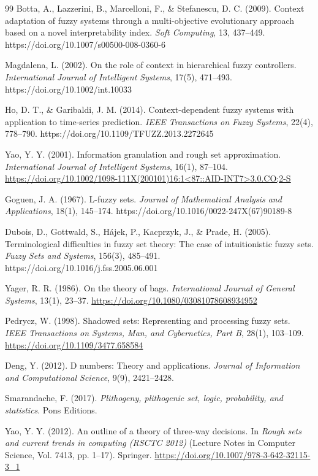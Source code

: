 \documentclass[reqno,final]{amsart}
\theoremstyle{definition}
\theoremstyle{plain}
\theoremstyle{remark}
\begin{document}
\begin{thebibliography}{99}
Botta, A., Lazzerini, B., Marcelloni, F., \& Stefanescu, D. C. (2009). Context adaptation of fuzzy systems through a multi-objective evolutionary approach based on a novel interpretability index. \textit{Soft Computing}, 13, 437--449. https://doi.org/10.1007/s00500-008-0360-6

Magdalena, L. (2002). On the role of context in hierarchical fuzzy controllers. \textit{International Journal of Intelligent Systems}, 17(5), 471--493. https://doi.org/10.1002/int.10033

Ho, D. T., \& Garibaldi, J. M. (2014). Context-dependent fuzzy systems with application to time-series prediction. \textit{IEEE Transactions on Fuzzy Systems}, 22(4), 778--790. https://doi.org/10.1109/TFUZZ.2013.2272645

Yao, Y. Y. (2001). Information granulation and rough set approximation. \textit{International Journal of Intelligent Systems}, 16(1), 87--104. \url{https://doi.org/10.1002/1098-111X(200101)16:1<87::AID-INT7>3.0.CO;2-S}

Goguen, J. A. (1967). L-fuzzy sets. \textit{Journal of Mathematical Analysis and Applications}, 18(1), 145--174. https://doi.org/10.1016/0022-247X(67)90189-8

Dubois, D., Gottwald, S., H\'ajek, P., Kacprzyk, J., \& Prade, H. (2005). Terminological difficulties in fuzzy set theory: The case of intuitionistic fuzzy sets. \textit{Fuzzy Sets and Systems}, 156(3), 485--491. https://doi.org/10.1016/j.fss.2005.06.001

Yager, R. R. (1986). On the theory of bags. \textit{International Journal of General Systems}, 13(1), 23--37. \url{https://doi.org/10.1080/03081078608934952}

Pedrycz, W. (1998). Shadowed sets: Representing and processing fuzzy sets. \textit{IEEE Transactions on Systems, Man, and Cybernetics, Part B}, 28(1), 103--109. \url{https://doi.org/10.1109/3477.658584}

Deng, Y. (2012). D numbers: Theory and applications. \textit{Journal of Information and Computational Science}, 9(9), 2421--2428.

Smarandache, F. (2017). \textit{Plithogeny, plithogenic set, logic, probability, and statistics}. Pons Editions.

Yao, Y. Y. (2012). An outline of a theory of three-way decisions. In \textit{Rough sets and current trends in computing (RSCTC 2012)} (Lecture Notes in Computer Science, Vol. 7413, pp. 1--17). Springer. \url{https://doi.org/10.1007/978-3-642-32115-3_1}


\end{thebibliography}
\end{document}
